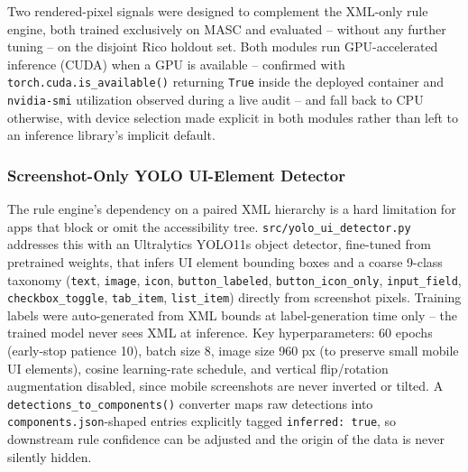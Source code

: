 \documentclass[10pt,conference]{IEEEtran}
\begin{document}
Two rendered-pixel signals were designed to complement the XML-only rule engine, both trained exclusively on MASC and evaluated -- without any further tuning -- on the disjoint Rico holdout set. Both modules run GPU-accelerated inference (CUDA) when a GPU is available -- confirmed with \texttt{torch.cuda.is\_available()} returning \texttt{True} inside the deployed container and \texttt{nvidia-smi} utilization observed during a live audit -- and fall back to CPU otherwise, with device selection made explicit in both modules rather than left to an inference library's implicit default.

\subsubsection{Screenshot-Only YOLO UI-Element Detector}
\label{sec:yolo}
The rule engine's dependency on a paired XML hierarchy is a hard limitation for apps that block or omit the accessibility tree. \texttt{src/yolo\_ui\_detector.py} addresses this with an Ultralytics YOLO11s object detector, fine-tuned from pretrained weights, that infers UI element bounding boxes and a coarse 9-class taxonomy (\texttt{text}, \texttt{image}, \texttt{icon}, \texttt{button\_labeled}, \texttt{button\_icon\_only}, \texttt{input\_field}, \texttt{checkbox\_toggle}, \texttt{tab\_item}, \texttt{list\_item}) directly from screenshot pixels. Training labels were auto-generated from XML bounds at label-generation time only -- the trained model never sees XML at inference. Key hyperparameters: 60 epochs (early-stop patience 10), batch size 8, image size 960 px (to preserve small mobile UI elements), cosine learning-rate schedule, and vertical flip/rotation augmentation disabled, since mobile screenshots are never inverted or tilted. A \texttt{detections\_to\_components()} converter maps raw detections into \texttt{components.json}-shaped entries explicitly tagged \texttt{inferred: true}, so downstream rule confidence can be adjusted and the origin of the data is never silently hidden.
\end{document}
